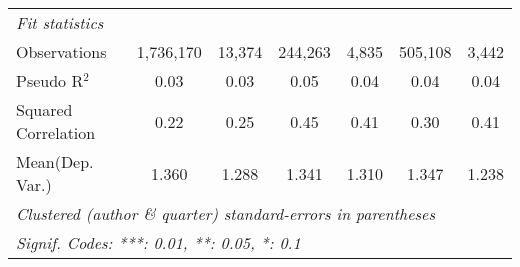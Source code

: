 \begin{tabular}{lcccccc}
   \midrule
   \emph{Fit statistics}\\
   Observations                                               & 1,736,170      & 13,374  & 244,263       & 4,835         & 505,108        & 3,442\\  
   Pseudo R$^2$                                               & 0.03           & 0.03    & 0.05          & 0.04          & 0.04           & 0.04\\  
   Squared Correlation                                        & 0.22           & 0.25    & 0.45          & 0.41          & 0.30           & 0.41\\  
Mean(Dep. Var.) & 1.360 & 1.288 & 1.341 & 1.310 & 1.347 & 1.238 \\
   \midrule \midrule
   \multicolumn{7}{l}{\emph{Clustered (author \& quarter) standard-errors in parentheses}}\\
   \multicolumn{7}{l}{\emph{Signif. Codes: ***: 0.01, **: 0.05, *: 0.1}}\\
\end{tabular}
\par\endgroup
